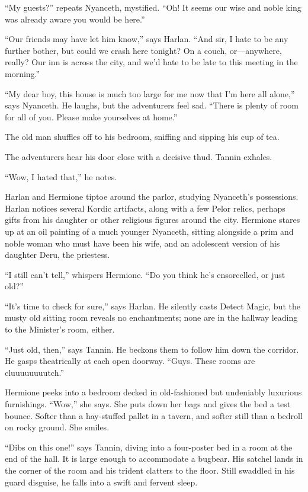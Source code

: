 \documentclass[smalldemyvopaper,11pt,twoside,onecolumn,openright,extrafontsizes]{memoir}
\begin{document}
``My guests?'' repeats Nyanceth, mystified. ``Oh! It seems our wise and
noble king was already aware you would be here.''

``Our friends may have let him know,'' says Harlan. ``And sir, I hate to
be any further bother, but could we crash here tonight? On a couch,
or---anywhere, really? Our inn is across the city, and we'd hate to be
late to this meeting in the morning.''

``My dear boy, this house is much too large for me now that I'm here all
alone,'' says Nyanceth. He laughs, but the adventurers feel sad. ``There
is plenty of room for all of you. Please make yourselves at home.''

The old man shuffles off to his bedroom, sniffing and sipping his cup of
tea.

The adventurers hear his door close with a decisive thud. Tannin
exhales.

``Wow, I hated that,'' he notes.

Harlan and Hermione tiptoe around the parlor, studying Nyanceth's
possessions. Harlan notices several Kordic artifacts, along with a few
Pelor relics, perhaps gifts from his daughter or other religious figures
around the city. Hermione stares up at an oil painting of a much younger
Nyanceth, sitting alongside a prim and noble woman who must have been
his wife, and an adolescent version of his daughter Deru, the priestess.

``I still can't tell,'' whispers Hermione. ``Do you think he's
ensorcelled, or just old?''

``It's time to check for sure,'' says Harlan. He silently casts Detect
Magic, but the musty old sitting room reveals no enchantments; none are
in the hallway leading to the Minister's room, either.

``Just old, then,'' says Tannin. He beckons them to follow him down the
corridor. He gasps theatrically at each open doorway. ``Guys. These
rooms are cluuuuuuuutch.''

Hermione peeks into a bedroom decked in old-fashioned but undeniably
luxurious furnishings. ``Wow,'' she says. She puts down her bags and
gives the bed a test bounce. Softer than a hay-stuffed pallet in a
tavern, and softer still than a bedroll on rocky ground. She smiles.

``Dibs on this one!'' says Tannin, diving into a four-poster bed in a
room at the end of the hall. It is large enough to accommodate a
bugbear. His satchel lands in the corner of the room and his trident
clatters to the floor. Still swaddled in his guard disguise, he falls
into a swift and fervent sleep.
\end{document}
